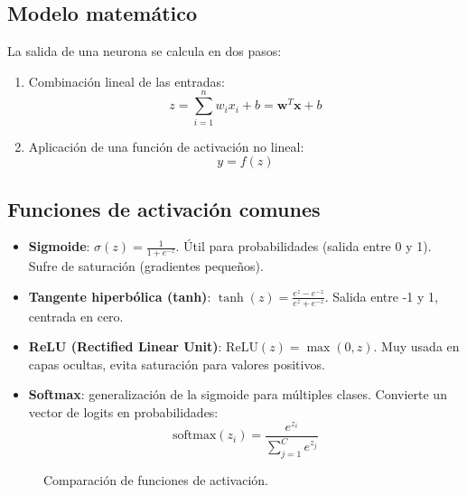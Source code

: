 \documentclass[12pt,a4paper,openany,oneside]{book}
\begin{document}
\subsection{Modelo matemático}
La salida de una neurona se calcula en dos pasos:
\begin{enumerate}
    \item Combinación lineal de las entradas: 
    \[
    z = \sum_{i=1}^{n} w_i x_i + b = \mathbf{w}^T \mathbf{x} + b
    \]
    \item Aplicación de una función de activación no lineal:
    \[
    y = f(z)
    \]
\end{enumerate}

\subsection{Funciones de activación comunes}
\begin{itemize}
    \item \textbf{Sigmoide}: \( \sigma(z) = \frac{1}{1 + e^{-z}} \). Útil para probabilidades (salida entre 0 y 1). Sufre de saturación (gradientes pequeños).
    \item \textbf{Tangente hiperbólica (tanh)}: \( \tanh(z) = \frac{e^{z} - e^{-z}}{e^{z} + e^{-z}} \). Salida entre -1 y 1, centrada en cero.
    \item \textbf{ReLU (Rectified Linear Unit)}: \( \text{ReLU}(z) = \max(0, z) \). Muy usada en capas ocultas, evita saturación para valores positivos.
    \item \textbf{Softmax}: generalización de la sigmoide para múltiples clases. Convierte un vector de logits en probabilidades:
    \[
    \text{softmax}(z_i) = \frac{e^{z_i}}{\sum_{j=1}^{C} e^{z_j}}
    \]
\end{itemize}

\begin{figure}[h]
\centering
{}
\caption{Comparación de funciones de activación.}
\label{fig:activaciones}
\end{figure}
\end{document}
